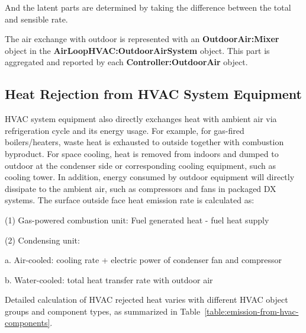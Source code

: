 And the latent parts are determined by taking the difference between the total and sensible rate.

The air exchange with outdoor is represented with an \textbf{OutdoorAir:Mixer} object in the \textbf{AirLoopHVAC:OutdoorAirSystem} object. This part is aggregated and reported by each \textbf{Controller:OutdoorAir} object.

\subsection{Heat Rejection from HVAC System Equipment}\label{emission-from-HVAC-reject}

HVAC system equipment also directly exchanges heat with ambient air via refrigeration cycle and its energy usage. For example, for gas-fired boilers/heaters, waste heat is exhausted to outside together with combustion byproduct. For space cooling, heat is removed from indoors and dumped to outdoor at the condenser side or corresponding cooling equipment, such as cooling tower. In addition, energy consumed by outdoor equipment will directly dissipate to the ambient air, such as compressors and fans in packaged DX systems. The surface outside face heat emission rate is calculated as:

(1)	Gas-powered combustion unit: Fuel generated heat - fuel heat supply

(2)	Condensing unit:

a.	Air-cooled: cooling rate + electric power of condenser fan and compressor

b.	Water-cooled: total heat transfer rate with outdoor air

Detailed calculation of HVAC rejected heat varies with different HVAC object groups and component types, as summarized in Table~\ref{table:emission-from-hvac-components}.

